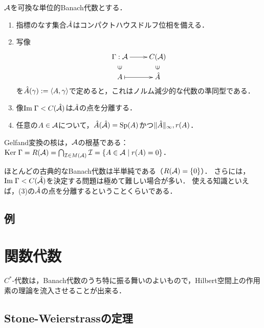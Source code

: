 \documentclass[uplatex,dvipdfmx]{jsreport}
\begin{document}
\begin{theorem}
    $\mathcal{A}$を可換な単位的Banach代数とする．
    \begin{enumerate}
        \item 指標のなす集合$\hat{\mathcal{A}}$はコンパクトハウスドルフ位相を備える．
        \item 写像
        \[\xymatrix@R-2pc{
            \Gamma:\A\ar[r]&C(\A)\\
            \rotatebox[origin=c]{90}{$\in$}&\rotatebox[origin=c]{90}{$\in$}\\
            A\ar@{|->}[r]&\hat{A}
        }\]
        を$\hat{A}(\gamma):=\langle A,\gamma\rangle$で定めると，これはノルム減少的な代数の準同型である．
        \item 像$\mathrm{Im}\;\Gamma<C(\hat{\mathcal{A}})$は$\hat{\mathcal{A}}$の点を分離する．
        \item 任意の$A\in\mathcal{A}$について，$\hat{A}(\hat{\mathcal{A}})=\mathrm{Sp}(A)$かつ$\|\hat{A}\|_\infty,r(A)$．
    \end{enumerate}
\end{theorem}

\begin{proposition}
    Gelfand変換の核は，$\mathcal{A}$の根基である：
    $\mathrm{Ker}\;\Gamma=R(\mathcal{A})=\bigcap_{\mathcal{I}\in M(\mathcal{A})}\mathcal{I}=\left\{A\in\mathcal{A}\mid r(A)=0\right\}$．
\end{proposition}
\begin{remark}
    ほとんどの古典的なBanach代数は半単純である（$R(\mathcal{A})=\{0\}$）．
    さらには，$\mathrm{Im}\;\Gamma<C(\hat{\mathcal{A}})$を決定する問題は極めて難しい場合が多い．
    使える知識といえば，(3)の$\hat{\mathcal{A}}$の点を分離するということくらいである．
\end{remark}

\subsection{例}

\section{関数代数}

\begin{tcolorbox}[colframe=ForestGreen, colback=ForestGreen!10!white,breakable,colbacktitle=ForestGreen!40!white,coltitle=black,fonttitle=\bfseries\sffamily,
title=]
    $C^*$-代数は，Banach代数のうち特に振る舞いのよいもので，Hilbert空間上の作用素の理論を流入させることが出来る．
\end{tcolorbox}

\subsection{Stone-Weierstrassの定理}
\end{document}
